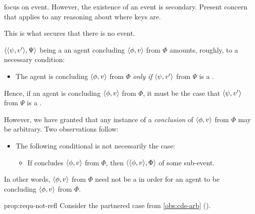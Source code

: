 \begin{note}
   focus on event.
  However, the existence of an event is secondary.
  Present concern that applies to any reasoning about where keys are.

  This is what secures that there is no event.
\end{note}


\begin{note}
  \(\langle \langle \psi, v' \rangle, \Psi \rangle\) being a  an agent concluding \(\langle \phi, v \rangle\) from \(\Phi\) amounts, roughly, to a necessary condition:
  \begin{itemize}
  \item
    The agent is concluding \(\langle \phi, v \rangle\) from \(\Phi\) \emph{only if} \(\langle \psi, v' \rangle\) from \(\Psi\) is a \fc{}.
  \end{itemize}

  Hence, if an agent is concluding \(\langle \phi, v \rangle\) from \(\Phi\), it must be the case that \(\langle \psi, v' \rangle\) from \(\Psi\) is a \fc{}.

  However, we have granted that any instance of a \emph{conclusion} of \(\langle \phi, v \rangle\) from \(\Phi\) may be arbitrary.
  Two observations follow:

  \begin{observation}
    \label{prop:requ-not-refl}

    \begin{itemize}
    \item
      The following conditional is not necessarily the case:
      \begin{itemize}
      \item
        If \vAgent{} concludes \(\langle \phi, v \rangle\) from \(\Phi\), then \(\langle \langle \phi, v \rangle, \Phi \rangle\) \requ{} of some sub-event.
      \end{itemize}
    \end{itemize}
    \vspace{-\baselineskip}
  \end{observation}

  In other words, \(\langle \phi, v \rangle\) from \(\Phi\) need not be a \fc{} in order for an agent to be concluding \(\langle \phi, v \rangle\) from \(\Phi\).

  \begin{motivation}{prop:requ-not-refl}
    Consider the partnered case from \autoref{obs:cds-arb} ().%
  \end{motivation}
\end{note}



